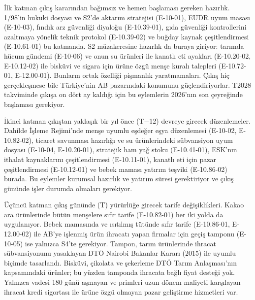 İlk katman çıkış kararından bağımsız ve hemen başlaması gereken hazırlık. 1/98'in hukuki dosyası ve S2'de aktarım stratejisi (E-10-01), EUDR uyum masası (E-10-03), fındık arz güvenliği diyaloğu (E-10.39-01), gıda güvenliği kontrollerini azaltmaya yönelik teknik protokol (E-10.39-02) ve buğday kaynak çeşitlendirmesi (E-10.61-01) bu katmanda. S2 müzakeresine hazırlık da buraya giriyor: tarımda hücum gündemi (E-10-06) ve onun su ürünleri ile kanatlı eti ayakları (E-10.20-02, E-10.12-02) ile bisküvi ve sigara için ürüne özgü menşe kuralı talepleri (E-10.72-01, E-12.00-01). Bunların ortak özelliği pişmanlık yaratmamaları. Çıkış hiç gerçekleşmese bile Türkiye'nin AB pazarındaki konumunu güçlendiriyorlar. T2028 takviminde çıkışa on dört ay kaldığı için bu eylemlerin 2026'nın son çeyreğinde başlaması gerekiyor.

İkinci katman çıkıştan yaklaşık bir yıl önce (T−12) devreye girecek düzenlemeler. Dahilde İşleme Rejimi'nde menşe uyumlu eşdeğer eşya düzenlemesi (E-10-02, E-10.82-02), ticaret savunması hazırlığı ve su ürünlerindeki sübvansiyon uyum dosyası (E-10-04, E-10.20-01), stratejik ham yağ stoku (E-10.41-01), ESK'nın ithalat kaynaklarını çeşitlendirmesi (E-10.11-01), kanatlı eti için pazar çeşitlendirmesi (E-10.12-01) ve bebek maması yatırım teşviki (E-10.86-02) burada. Bu eylemler kurumsal hazırlık ve yatırım süresi gerektiriyor ve çıkış gününde işler durumda olmaları gerekiyor.

Üçüncü katman çıkış gününde (T) yürürlüğe girecek tarife değişiklikleri. Kakao ara ürünlerinde bütün menşelere sıfır tarife (E-10.82-01) her iki yolda da uygulanıyor. Bebek mamasında ve ısıtılmış tütünde sıfır tarife (E-10.86-01, E-12.00-02) ile AB'ye işlenmiş ürün ihracatı yapan firmalar için geçiş tamponu (E-10-05) ise yalnızca S4'te gerekiyor. Tampon, tarım ürünlerinde ihracat sübvansiyonunu yasaklayan DTÖ Nairobi Bakanlar Kararı (2015) ile uyumlu biçimde tasarlandı. Bisküvi, çikolata ve şekerleme DTÖ Tarım Anlaşması'nın kapsamındaki ürünler; bu yüzden tamponda ihracata bağlı fiyat desteği yok. Yalnızca vadesi 180 günü aşmayan ve primleri uzun dönem maliyeti karşılayan ihracat kredi sigortası ile ürüne özgü olmayan pazar geliştirme hizmetleri var.

